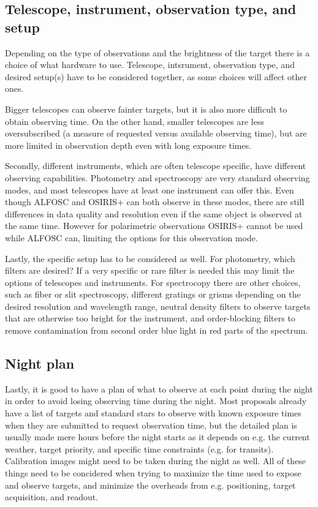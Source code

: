 \documentclass[a4paper,oneside,12pt, class=Latex/Classes/PhDthesisPSnPDF, crop=false]{standalone}
\begin{document}
\subsection{Telescope, instrument, observation type, and setup}
Depending on the type of observations and the brightness of the target there is a choice of what hardware to use. Telescope, intsrument, observation type, and desired setup(s) have to be considered together, as some choices will affect other ones.

Bigger telescopes can observe fainter targets, but it is also more difficult to obtain observing time. On the other hand, smaller telescopes are less oversubscribed (a measure of requested versus available observing time), but are more limited in observation depth even with long exposure times.

Secondly, different instruments, which are often telescope specific, have different observing capabilities. Photometry and spectroscopy are very standard observing modes, and most telescopes have at least one instrument can offer this. Even though ALFOSC and OSIRIS+ can both observe in these modes, there are still differences in data quality and resolution even if the same object is observed at the same time. However for polarimetric observations OSIRIS+ cannot be used while ALFOSC can, limiting the options for this observation mode.

Lastly, the specific setup has to be considered as well. For photometry, which filters are desired? If a very specific or rare filter is needed this may limit the options of telescopes and instruments. For spectrocopy there are other choices, such as fiber or slit spectroscopy, different gratings or grisms depending on the desired resolution and wavelength range, neutral density filters to observe targets that are otherwise too bright for the instrument, and order-blocking filters to remove contamination from second order blue light in red parts of the spectrum.


\subsection{Night plan}
Lastly, it is good to have a plan of what to observe at each point during the night in order to avoid losing observing time during the night. Most proposals already have a list of targets and standard stars to observe with known exposure times when they are submitted to request observation time, but the detailed plan is usually made mere hours before the night starts as it depends on e.g. the current weather, target priority, and specific time constraints (e.g. for transits). Calibration images might need to be taken during the night as well. All of these things need to be concidered when trying to maximize the time used to expose and observe targets, and minimize the overheads from e.g. positioning, target acquisition, and readout.
\end{document}
